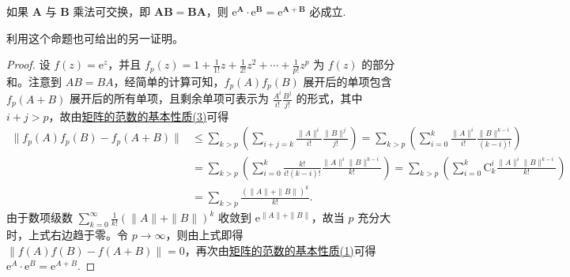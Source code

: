 \documentclass[../../main.tex]{subfiles}%
\begin{document}
\begin{proposition}\label{proposition:矩阵乘法可交换必成立e^A乘e^B=e^A+B}
如果 $\boldsymbol{A}$ 与 $\boldsymbol{B}$ 乘法可交换，即 $\boldsymbol{A}\boldsymbol{B}=\boldsymbol{B}\boldsymbol{A}$，则 $\mathrm{e}^{\boldsymbol{A}}\cdot\mathrm{e}^{\boldsymbol{B}}=\mathrm{e}^{\boldsymbol{A}+\boldsymbol{B}}$ 必成立.
\end{proposition}
\begin{remark}
利用这个命题也可给出的另一证明。 
\end{remark}
\begin{proof}
设 $f(z)=\mathrm{e}^z$，并且 $f_p(z)=1+\frac{1}{1!}z+\frac{1}{2!}z^2+\cdots+\frac{1}{p!}z^p$ 为 $f(z)$ 的部分和。注意到 $AB = BA$，经简单的计算可知，$f_p(A)f_p(B)$ 展开后的单项包含 $f_p(A + B)$ 展开后的所有单项，且剩余单项可表示为 $\frac{A^i}{i!}\frac{B^j}{j!}$ 的形式，其中 $i + j>p$，故由\hyperref[proposition:矩阵的范数的基本性质]{矩阵的范数的基本性质(3)}可得
\begin{align*}
\parallel f_p(A)f_p(B)-f_p(A+B)\parallel &\leqslant \sum_{k>p}{\left( \sum_{i+j=k}{\frac{\parallel A\parallel ^i}{i!}\frac{\parallel B\parallel ^j}{j!}} \right)}=\sum_{k>p}{\left( \sum_{i=0}^k{\frac{\parallel A\parallel ^i}{i!}\frac{\parallel B\parallel ^{k-i}}{\left( k-i \right) !}} \right)}
\\
&=\sum_{k>p}{\left( \sum_{i=0}^k{\frac{k!}{i!\left( k-i \right) !}\frac{\parallel A\parallel ^i\parallel B\parallel ^{k-i}}{k!}} \right)}=\sum_{k>p}{\left( \sum_{i=0}^k{\mathrm{C}_{k}^{i}\frac{\parallel A\parallel ^i\parallel B\parallel ^{k-i}}{k!}} \right)}
\\
&=\sum_{k>p}{\frac{(\parallel A\parallel +\parallel B\parallel )^k}{k!}}.
\end{align*}
由于数项级数 $\sum_{k = 0}^{\infty}\frac{1}{k!}(\|A\|+\|B\|)^k$ 收敛到 $\mathrm{e}^{\|A\|+\|B\|}$，故当 $p$ 充分大时，上式右边趋于零。令 $p\to\infty$，则由上式即得 $\|f(A)f(B)-f(A + B)\| = 0$，再次由\hyperref[proposition:矩阵的范数的基本性质]{矩阵的范数的基本性质(1)}可得 $\mathrm{e}^A\cdot\mathrm{e}^B = \mathrm{e}^{A + B}$.
\end{proof}
\end{document}

